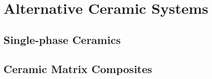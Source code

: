 \section{Alternative Ceramic Systems}
\subsection{Single-phase Ceramics}
\subsection{Ceramic Matrix Composites}